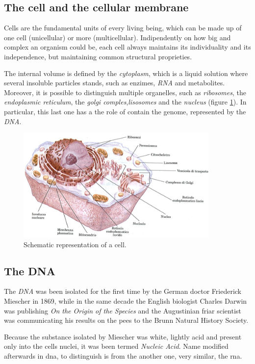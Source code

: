 \subsection{The cell and the cellular membrane}
\label{sec:cell}
Cells are the fundamental units of every living being, which can be made up of one cell (unicellular) or more (multicellular).
Indipendently on how big and complex an organism could be, each cell always maintains its individuality and its independence, but maintaining common structural proprieties.

The internal volume is defined by the \textit{cytoplasm}, which is a liquid solution where several insoluble particles stands, such as enzimes, \textit{RNA} and metabolites.
Moreover, it is possible to distinguish multiple organelles, such as \textit{ribosomes}, the \textit{endoplasmic reticulum}, the \textit{golgi comples},\textit{lisosomes} and the \textit{nucleus} (figure \ref{fig:cell}).
In particular, this last one has a the role of contain the genome, represented by the \textit{DNA}.

\begin{figure}[h]
\centering
\includegraphics[width=10cm, keepaspectratio]{img/intro/cell.png}
\caption[The Cell]{Schematic representation of a cell.}
\label{fig:cell}
\end{figure}

\subsection{The DNA}
\label{sec:genica}
The \textit{DNA} was been isolated for the first time by the German doctor Friederick Miescher in 1869, while in the same decade the English biologist Charles Darwin was publishing \textit{On the Origin of the Species} and the  Augustinian friar scientist was communicating his results on the pees to the Brunn Natural History Society.

Because the substance isolated by Miescher was white, lightly acid and present only into the cells nuclei, it was been termed \textit{Nucleic Acid}.
Name modified afterwards in \gls{dna}, to distinguish is from the another one, very similar, the \gls{rna}.

